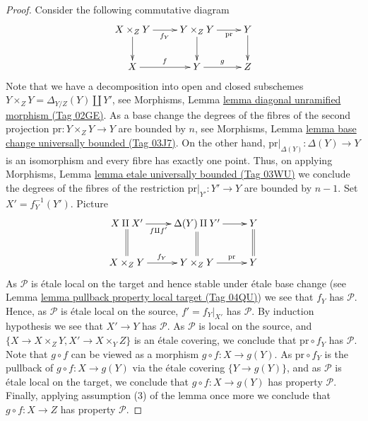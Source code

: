 \documentclass{amsart}
\theoremstyle{plain}
\theoremstyle{definition}
\theoremstyle{remark}
\numberwithin{equation}{subsection}
\begin{document}
\begin{proof}
\medskip\noindent
Consider the following commutative diagram
$$
\xymatrix{
X \times_Z Y \ar[d] \ar[r]_{f_Y} &
Y \times_Z Y \ar[d] \ar[r]_-{\text{pr}} &
Y \ar[d] \\
X \ar[r]^f &
Y \ar[r]^g &
Z
}
$$
Note that we have a decomposition into open and closed
subschemes $Y \times_Z Y = \Delta_{Y/Z}(Y) \amalg Y'$, see
Morphisms, Lemma \href{https://stacks.math.columbia.edu/tag/02GE}{lemma diagonal unramified morphism (Tag 02GE)}.
As a base change the degrees of the fibres of the second projection
$\text{pr} : Y \times_Z Y \to Y$ are bounded by $n$, see
Morphisms, Lemma \href{https://stacks.math.columbia.edu/tag/03J7}{lemma base change universally bounded (Tag 03J7)}.
On the other hand, $\text{pr}|_{\Delta(Y)} : \Delta(Y) \to Y$ is
an isomorphism and every fibre has exactly one point.
Thus, on applying
Morphisms, Lemma \href{https://stacks.math.columbia.edu/tag/03WU}{lemma etale universally bounded (Tag 03WU)}
we conclude the degrees of the fibres of the restriction
$\text{pr}|_{Y'} : Y' \to Y$ are bounded by $n - 1$.
Set $X' = f_Y^{-1}(Y')$. Picture
$$
\xymatrix{
X \amalg X' \ar@{=}[d] \ar[r]_-{f \amalg f'} &
\Delta(Y) \amalg Y' \ar@{=}[d] \ar[r] &
Y \ar@{=}[d] \\
X \times_Z Y \ar[r]^{f_Y} &
Y \times_Z Y \ar[r]^-{\text{pr}} &
Y
}
$$
As $\mathcal{P}$ is \'etale local on the target and hence stable under
\'etale base change (see
Lemma \href{https://stacks.math.columbia.edu/tag/04QU}{lemma pullback property local target (Tag 04QU)})
we see that $f_Y$ has $\mathcal{P}$.
Hence, as $\mathcal{P}$ is \'etale local on the source,
$f' = f_Y|_{X'}$ has $\mathcal{P}$. By induction hypothesis
we see that $X' \to Y$ has $\mathcal{P}$.
As $\mathcal{P}$ is local on the source, and
$\{X \to X \times_Z Y, X' \to X \times_Y Z\}$ is an \'etale covering,
we conclude that $\text{pr} \circ f_Y$ has $\mathcal{P}$.
Note that $g \circ f$ can be viewed as a morphism
$g \circ f : X \to g(Y)$. As $\text{pr} \circ f_Y$ is the pullback of
$g \circ f : X \to g(Y)$ via the \'etale covering $\{Y \to g(Y)\}$,
and as $\mathcal{P}$ is \'etale local on the target, we conclude that
$g \circ f : X \to g(Y)$ has property $\mathcal{P}$. Finally, applying
assumption (3) of the lemma once more we conclude that
$g \circ f : X \to Z$ has property $\mathcal{P}$.
\end{proof}
\end{document}

